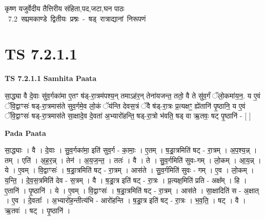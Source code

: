 \documentclass[17pt]{extarticle}
\begin{document}
\begin{titlepage}
    \begin{center}
 
\begin{sanskrit}
    { \Large
    कृष्ण यजुर्वेदीय तैत्तिरीय संहिता,पद,जटा,घन पाठः 
    }
    \\
    \vspace{2.5cm}
    \mbox{ \Large
    7.2      सप्तमकाण्डे द्वितीयः प्रश्नः - षड् रात्राद्यानां निरूपणं   }
\end{sanskrit}
\end{center}

\end{titlepage}
\tableofcontents
{}
\pagebreak


\section{ TS 7.2.1.1 }

\textbf{TS 7.2.1.1 } \newline
\textbf{Samhita Paata} \newline

सा॒द्ध्या वै दे॒वाः सु॑व॒र्गका॑मा ए॒तꣳ ष॑ड्-रा॒त्रम॑पश्य॒न् तमाऽह॑र॒न् तेना॑यजन्त॒ ततो॒ वै ते सु॑व॒र्गं ॅलो॒कमा॑य॒न॒. य ए॒वं ॅवि॒द्वाꣳसः॑ षड्-रा॒त्रमास॑ते सुव॒र्गमे॒व लो॒कं ॅय॑न्ति देवस॒त्रं ॅवै ष॑ड्-रा॒त्रः प्र॒त्यक्षꣳ॒॒ ह्ये॑तानि॑ पृ॒ष्ठानि॒ य ए॒वं ॅवि॒द्वाꣳसः॑ षड्-रा॒त्रमास॑ते सा॒क्षादे॒व दे॒वता॑ अ॒भ्यारो॑हन्ति॒ षड्-रा॒त्रो भ॑वति॒ षड् वा ऋ॒तवः॒ षट् पृ॒ष्ठानि॑ - [  ] \newline

\textbf{Pada Paata} \newline

सा॒द्ध्याः । वै । दे॒वाः । सु॒व॒र्गका॑मा॒ इति॑ सुव॒र्ग - का॒माः॒ । ए॒तम् । ष॒ड्रा॒त्रमिति॑ षट् - रा॒त्रम् । अ॒प॒श्य॒न्न् । तम् । एति॑ । अ॒ह॒र॒न्न् । तेन॑ । अ॒य॒ज॒न्त॒ । ततः॑ । वै । ते । सु॒व॒र्गमिति॑ सुवः-गम् । लो॒कम् । आ॒य॒न्न् । ये । ए॒वम् । वि॒द्वाꣳसः॑ । ष॒ड्रा॒त्रमिति॑ षट् - रा॒त्रम् । आस॑ते । सु॒व॒र्गमिति॑ सुवः - गम् । ए॒व । लो॒कम् । य॒न्ति॒ । दे॒व॒स॒त्रमिति॑ देव - स॒त्रम् । वै । ष॒ड्रा॒त्र इति॑ षट् - रा॒त्रः । प्र॒त्यक्ष॒मिति॑ प्रति - अक्ष᳚म् । हि । ए॒तानि॑ । पृ॒ष्ठानि॑ । ये । ए॒वम् । वि॒द्वाꣳसः॑ । ष॒ड्रा॒त्रमिति॑ षट् - रा॒त्रम् । आस॑ते । सा॒क्षादिति॑ स - अ॒क्षात् । ए॒व । दे॒वताः᳚ । अ॒भ्यारो॑ह॒न्तीत्य॑भि - आरो॑हन्ति । ष॒ड्रा॒त्र इति॑ षट् - रा॒त्रः । भ॒व॒ति॒ । षट् । वै । ऋ॒तवः॑ । षट् । पृ॒ष्ठानि॑ ।  \newline
\end{document}
